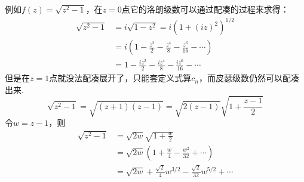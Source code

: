 \documentclass[main.tex]{subfiles}
\begin{document}
例如\(f(z)=\sqrt{z^2-1}\)，在\(z=0\)点它的洛朗级数可以通过配凑的过程来求得：
\begin{align*}
    \sqrt{z^2-1} & =i\sqrt{1-z^2}=i\left(1+(iz)^2\right)^{1/2} \\
    &= i\left(1-\frac{z^2}{2}-\frac{z^4}{8}-\frac{z^6}{16}-\cdots\right)\\ 
    &= 1-\frac{iz^2}{2}-\frac{iz^4}{8}-\frac{iz^6}{16}-\cdots
\end{align*}
但是在\(z=1\)点就没法配凑展开了，只能套定义式算\(c_n\)，而皮瑟级数仍然可以配凑出来.
\[\sqrt{z^2-1}=\sqrt{(z+1)(z-1)}=\sqrt{2(z-1)}\sqrt{1+\frac{z-1}{2}}\]
令\(w=z-1\)，则
\begin{align*}
    \sqrt{z^2-1} &= \sqrt{2w}\sqrt{1+\frac{w}{2}} \\
    & = \sqrt{2w} \left( 1+\frac{w}{4}-\frac{w^2}{32}+\cdots \right)\\
    &= \sqrt{2w}+\frac{\sqrt{2}}{4}w^{3/2}-\frac{\sqrt{2}}{32}w^{5/2}+\cdots
\end{align*}
\end{document}
